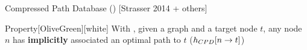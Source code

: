 \begin{frame}{Compressed Path Database (\CPD{}) [Strasser 2014 + others]}
\begin{minipage}{0.50\textwidth}
\begin{center}
        \end{center}     
    \end{minipage}
    \begin{coloredBlock}{Property}[OliveGreen][white]
        With \CPD{}, given a graph and a target node $t$, any node $n$ has \textbf{implicitly} associated an optimal path to $t$ ($\CPDPath{}[n \rightarrow t]$)
    \end{coloredBlock}

\end{frame}